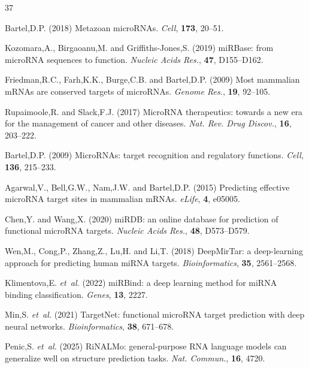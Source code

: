 \documentclass[unnumsec,webpdf,contemporary,large]{oup-authoring-template}
\begin{document}
\begin{thebibliography}{37}

Bartel,D.P. (2018) Metazoan microRNAs. \textit{Cell}, \textbf{173}, 20--51.

Kozomara,A., Birgaoanu,M. and Griffiths-Jones,S. (2019) miRBase: from microRNA sequences to function. \textit{Nucleic Acids Res.}, \textbf{47}, D155--D162.

Friedman,R.C., Farh,K.K., Burge,C.B. and Bartel,D.P. (2009) Most mammalian mRNAs are conserved targets of microRNAs. \textit{Genome Res.}, \textbf{19}, 92--105.

Rupaimoole,R. and Slack,F.J. (2017) MicroRNA therapeutics: towards a new era for the management of cancer and other diseases. \textit{Nat. Rev. Drug Discov.}, \textbf{16}, 203--222.

Bartel,D.P. (2009) MicroRNAs: target recognition and regulatory functions. \textit{Cell}, \textbf{136}, 215--233.

Agarwal,V., Bell,G.W., Nam,J.W. and Bartel,D.P. (2015) Predicting effective microRNA target sites in mammalian mRNAs. \textit{eLife}, \textbf{4}, e05005.

Chen,Y. and Wang,X. (2020) miRDB: an online database for prediction of functional microRNA targets. \textit{Nucleic Acids Res.}, \textbf{48}, D573--D579.

Wen,M., Cong,P., Zhang,Z., Lu,H. and Li,T. (2018) DeepMirTar: a deep-learning approach for predicting human miRNA targets. \textit{Bioinformatics}, \textbf{35}, 2561--2568.

Klimentova,E. \textit{et~al.} (2022) miRBind: a deep learning method for miRNA binding classification. \textit{Genes}, \textbf{13}, 2227.

Min,S. \textit{et~al.} (2021) TargetNet: functional microRNA target prediction with deep neural networks. \textit{Bioinformatics}, \textbf{38}, 671--678.

Penic,S. \textit{et~al.} (2025) RiNALMo: general-purpose RNA language models can generalize well on structure prediction tasks. \textit{Nat. Commun.}, \textbf{16}, 4720.


\end{thebibliography}
\end{document}
